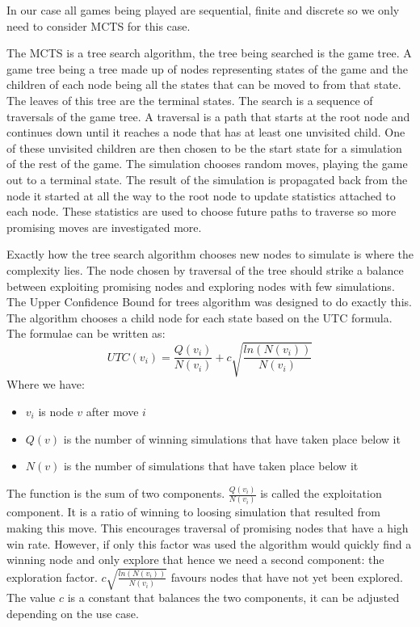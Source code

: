 \documentclass[a4paper,10pt]{report}
\begin{document}
In our case all games being played are sequential, finite and discrete so we only need to consider MCTS for this case.

The MCTS is a tree search algorithm, the tree being searched is the game tree. A game tree being a tree made up of nodes representing states of the game and the children of each node being all the states that can be moved to from that state. The leaves of this tree are the terminal states. The search is a sequence of traversals of the game tree. A traversal is a path that starts at the root node and continues down until it reaches a node that has at least one unvisited child. One of these unvisited children are then chosen to be the start state for a simulation of the rest of the game. The simulation chooses random moves, playing the game out to a terminal state. The result of the simulation is propagated back from the node it started at all the way to the root node to update statistics attached to each node. These statistics are used to choose future paths to traverse so more promising moves are investigated more.

Exactly how the tree search algorithm chooses new nodes to simulate is where the complexity lies. The node chosen by traversal of the tree should strike a balance between exploiting promising nodes and exploring nodes with few simulations. The Upper Confidence Bound for trees algorithm was designed to do exactly this\cite{Kocsis/UCT}. The algorithm chooses a child node for each state based on the UTC formula. The formulae can be written as: \[UTC(v_i) = \frac{Q(v_i)}{N(v_i)} + c\sqrt{\frac{ln(N(v_i))}{N(v_i)}}\] Where we have:
\begin{itemize}
\item $v_i$ is node $v$ after move $i$
\item $Q(v)$ is the number of winning simulations that have taken place below it
\item $N(v)$ is the number of simulations that have taken place below it
\end{itemize}
The function is the sum of two components. $\frac{Q(v_i)}{N(v_i)}$ is called the exploitation component. It is a ratio of winning to loosing simulation that resulted from making this move. This encourages traversal of promising nodes that have a high win rate. However, if only this factor was used the algorithm would quickly find a winning node and only explore that hence we need a second component: the exploration factor. $c\sqrt{\frac{ln(N(v_i))}{N(v_i)}}$ favours nodes that have not yet been explored. The value $c$ is a constant that balances the two components, it can be adjusted depending on the use case.
\end{document}
